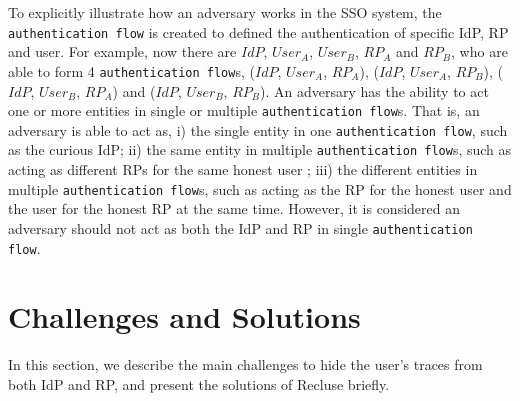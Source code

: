 To explicitly illustrate how an adversary works in the SSO system, the \verb+authentication flow+ is created to defined the authentication of specific IdP,  RP and user. For example, now there are $IdP$, $User_{A}$, $User_{B}$, $RP_{A}$ and $RP_{B}$, who are able to form 4 \verb+authentication flow+s, ($IdP$, $User_{A}$, $RP_{A}$), ($IdP$, $User_{A}$, $RP_{B}$), ($IdP$, $User_{B}$, $RP_{A}$) and ($IdP$, $User_{B}$, $RP_{B}$). An adversary has the ability to act one or more entities in single or multiple \verb+authentication flow+s. That is, an adversary is able to act as, i) the single entity in one \verb+authentication flow+, such as the curious IdP; ii) the same entity in multiple \verb+authentication flow+s, such as acting as different RPs for the same honest user ; iii) the different entities in multiple \verb+authentication flow+s, such as acting as the RP for the honest user and the user for the honest RP at the same time. However, it is considered an adversary should not act as both the IdP and RP in single \verb+authentication flow+.




\section{Challenges and Solutions}
\label{sec:challenge}
In this section, we describe  the main challenges to hide the user's traces from both IdP and RP, and present the solutions of Recluse briefly.


